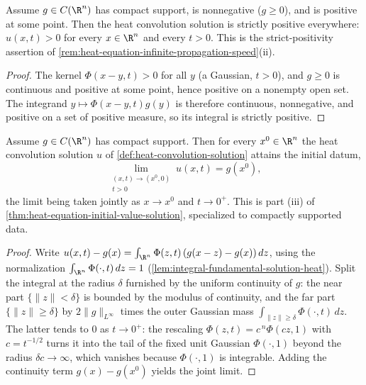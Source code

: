 \begin{lemma}
\label{lem:heat-infinite-propagation-speed}
\leanok
Assume $g \in C(\R^n)$ has compact support, is nonnegative ($g \ge 0$), and is
positive at some point. Then the heat convolution solution is strictly positive
everywhere: $u(x,t) > 0$ for every $x \in \R^n$ and every $t > 0$. This is the
strict-positivity assertion of
\cref{rem:heat-equation-infinite-propagation-speed}(ii).
\end{lemma}
\begin{proof}
\leanok
The kernel $\Phi(x-y,t) > 0$ for all $y$ (a Gaussian, $t>0$), and $g \ge 0$ is
continuous and positive at some point, hence positive on a nonempty open set. The
integrand $y \mapsto \Phi(x-y,t)g(y)$ is therefore continuous, nonnegative, and
positive on a set of positive measure, so its integral is strictly positive.
\end{proof}

\begin{lemma}
\label{lem:heat-convolution-attains-initial-data}
\leanok
Assume $g \in C(\R^n)$ has compact support. Then for every $x^0 \in \R^n$ the heat
convolution solution $u$ of \cref{def:heat-convolution-solution} attains the initial datum,
$$\lim_{\substack{(x,t) \to (x^0,0) \\ t > 0}} u(x,t) = g(x^0),$$
the limit being taken jointly as $x \to x^0$ and $t \to 0^+$. This is part (iii) of
\cref{thm:heat-equation-initial-value-solution}, specialized to compactly supported data.
\end{lemma}
\begin{proof}
\leanok
Write $u(x,t) - g(x) = \int_{\R^n}\Phi(z,t)\,(g(x-z)-g(x))\,dz$, using the normalization
$\int_{\R^n}\Phi(\cdot,t)\,dz = 1$ (\cref{lem:integral-fundamental-solution-heat}). Split the
integral at the radius $\delta$ furnished by the uniform continuity of $g$: the near part
$\{\|z\|<\delta\}$ is bounded by the modulus of continuity, and the far part
$\{\|z\|\ge\delta\}$ by $2\|g\|_{L^\infty}$ times the outer Gaussian mass
$\int_{\|z\|\ge\delta}\Phi(\cdot,t)\,dz$. The latter tends to $0$ as $t \to 0^+$: the rescaling
$\Phi(z,t) = c^{\,n}\Phi(cz,1)$ with $c = t^{-1/2}$ turns it into the tail of the fixed unit
Gaussian $\Phi(\cdot,1)$ beyond the radius $\delta c \to \infty$, which vanishes because
$\Phi(\cdot,1)$ is integrable. Adding the continuity term $g(x)-g(x^0)$ yields the joint limit.
\end{proof}

